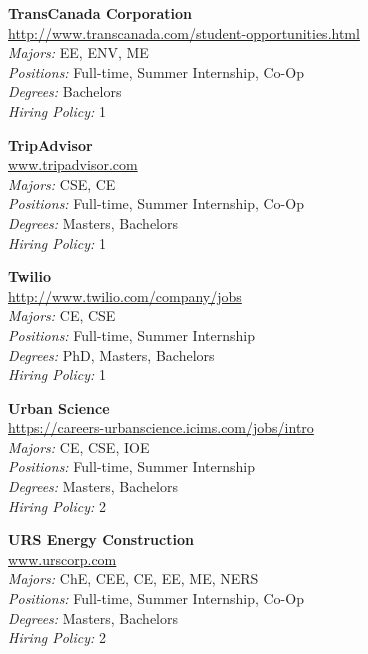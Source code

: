 \documentclass[twoside]{article}
\begin{document}
\begin{center}
\begin{multicols}{3}
\begin{minipage}{.9\columnwidth}{\Large\bf TransCanada Corporation }\\
	\url{http://www.transcanada.com/student-opportunities.html}\\
	\emph{Majors:} EE, ENV, ME\\
	\emph{Positions:} Full-time, Summer Internship, Co-Op\\
	\emph{Degrees:} Bachelors\\
	\emph{Hiring Policy:} 1\\
\end{minipage}
 
\begin{minipage}{.9\columnwidth}{\Large\bf TripAdvisor }\\
	\url{www.tripadvisor.com}\\
	\emph{Majors:} CSE, CE\\
	\emph{Positions:} Full-time, Summer Internship, Co-Op\\
	\emph{Degrees:} Masters, Bachelors\\
	\emph{Hiring Policy:} 1\\
\end{minipage}
 
\begin{minipage}{.9\columnwidth}{\Large\bf Twilio }\\
	\url{http://www.twilio.com/company/jobs}\\
	\emph{Majors:} CE, CSE\\
	\emph{Positions:} Full-time, Summer Internship\\
	\emph{Degrees:} PhD, Masters, Bachelors\\
	\emph{Hiring Policy:} 1\\
\end{minipage}
 
\begin{minipage}{.9\columnwidth}{\Large\bf Urban Science }\\
	\url{https://careers-urbanscience.icims.com/jobs/intro}\\
	\emph{Majors:} CE, CSE, IOE\\
	\emph{Positions:} Full-time, Summer Internship\\
	\emph{Degrees:} Masters, Bachelors\\
	\emph{Hiring Policy:} 2\\
\end{minipage}
 
\begin{minipage}{.9\columnwidth}{\Large\bf URS Energy Construction }\\
	\url{www.urscorp.com}\\
	\emph{Majors:} ChE, CEE, CE, EE, ME, NERS\\
	\emph{Positions:} Full-time, Summer Internship, Co-Op\\
	\emph{Degrees:} Masters, Bachelors\\
	\emph{Hiring Policy:} 2\\
\end{minipage}
 

\end{multicols}
\end{center}
\end{document}
